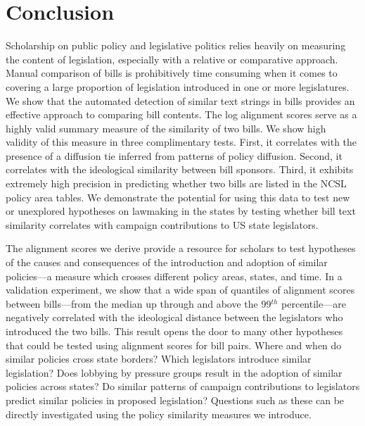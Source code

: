 \documentclass[12pt]{article} %
\begin{document}
\clearpage


\section{Conclusion}
Scholarship on public policy and legislative politics relies heavily on measuring the content of legislation, especially with a relative or comparative approach. Manual comparison of bills is prohibitively time consuming when it comes to covering a large proportion of legislation introduced in one or more legislatures. We show that the automated detection of similar text strings in bills provides an effective approach to comparing bill contents. The log alignment scores serve as a highly valid summary measure of the similarity of two bills. We show high validity of this measure in three complimentary tests. First, it correlates with the presence of a diffusion tie inferred from patterns of policy diffusion. Second, it correlates with the ideological similarity between bill sponsors. Third, it exhibits extremely high precision in predicting whether two bills are listed in the NCSL policy area tables. We demonstrate the potential for using this data to test new or unexplored hypotheses on lawmaking in the states by testing whether bill text similarity correlates with campaign contributions to US state legislators.

The alignment scores we derive provide a resource for scholars to test hypotheses of the causes and consequences of the introduction and adoption of similar policies---a measure which crosses different policy areas, states, and time. In a validation experiment, we show that a wide span of quantiles of alignment scores between bills---from the median up through and above the 99$^{th}$ percentile---are negatively correlated with the ideological distance between the legislators who introduced the two bills. This result opens the door to many other hypotheses that could be tested using alignment scores for bill pairs.  Where and when do similar policies cross state borders? Which legislators introduce similar legislation? Does lobbying by pressure groups result in the adoption of similar policies across states? Do similar patterns of campaign contributions to legislators predict similar policies in proposed legislation? Questions such as these can be directly investigated using the policy similarity measures we introduce. 
\end{document}
